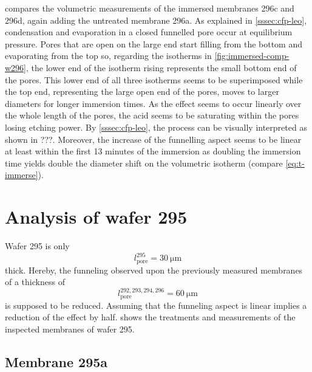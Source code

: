\documentclass[thesis.tex]{subfiles}
\begin{document}
            

             compares the volumetric measurements of the immersed membranes 296c and 296d, again adding the untreated membrane 296a. As explained in \cref{sssec:cfp-leo}, condensation and evaporation in a closed funnelled pore occur at equilibrium pressure. Pores that are open on the large end start filling from the bottom and evaporating from the top so, regarding the isotherms in \cref{fig:immersed-comp-w296}, the lower end of the isotherm rising represents the small bottom end of the pores. This lower end of all three isotherms seems to be superimposed while the top end, representing the large open end of the pores, moves to larger diameters for longer immersion times. As the effect seems to occur linearly over the whole length of the pores, the acid seems to be saturating within the pores losing etching power. By \cref{sssec:cfp-leo}, the process can be visually interpreted as shown in ???. Moreover, the increase of the funnelling aspect seems to be linear at least within the first 13 minutes of the immersion as doubling the immersion time yields double the diameter shift on the volumetric isotherm (compare \cref{eq:t-immerse}).

            


    \section{Analysis of wafer 295}
    \label{sec:wafer295}

        Wafer 295 is only
        \begin{equation}
            l^{295}_\mathrm{pore}=\SI{30}{\micro\meter}
        \end{equation}
        thick. Hereby, the funneling observed upon the previously measured membranes of a thickness of
        \begin{equation}
            l^{292,293,294,296}_\mathrm{pore}=\SI{60}{\micro\meter}
        \end{equation}
        is supposed to be reduced. Assuming that the funneling aspect is linear implies a reduction of the effect by half.  shows the treatments and measurements of the inspected membranes of wafer 295.

        

        \subsection{Membrane 295a}
\end{document}
